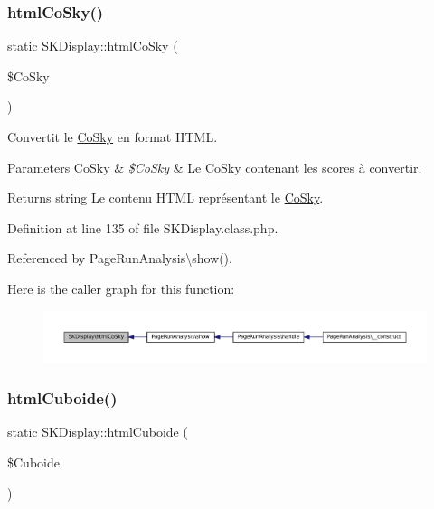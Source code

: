 \subsubsection{\texorpdfstring{html\+Co\+Sky()}{htmlCoSky()}}
{\footnotesize\ttfamily static S\+K\+Display\+::html\+Co\+Sky (\begin{DoxyParamCaption}\item[{}]{\$\+Co\+Sky }\end{DoxyParamCaption})\hspace{0.3cm}{\ttfamily [static]}}

Convertit le \hyperlink{class_co_sky}{Co\+Sky} en format H\+T\+ML.


\begin{DoxyParams}[1]{Parameters}
\hyperlink{class_co_sky}{Co\+Sky} & {\em \$\+Co\+Sky} & Le \hyperlink{class_co_sky}{Co\+Sky} contenant les scores à convertir. \\
\hline
\end{DoxyParams}
\begin{DoxyReturn}{Returns}
string Le contenu H\+T\+ML représentant le \hyperlink{class_co_sky}{Co\+Sky}. 
\end{DoxyReturn}


Definition at line 135 of file S\+K\+Display.\+class.\+php.



Referenced by Page\+Run\+Analysis\textbackslash{}show().

Here is the caller graph for this function\+:\nopagebreak
\begin{figure}[H]
\begin{center}
\leavevmode
\includegraphics[width=350pt]{class_s_k_display_a300475659a3435d38f6dc5c5ee8b5643_icgraph}
\end{center}
\end{figure}
\mbox{\label{class_s_k_display_a9a8e373b3aec7d3cbb8ce82b0a2b8b31}} 
\subsubsection{\texorpdfstring{html\+Cuboide()}{htmlCuboide()}}
{\footnotesize\ttfamily static S\+K\+Display\+::html\+Cuboide (\begin{DoxyParamCaption}\item[{}]{\$\+Cuboide }\end{DoxyParamCaption})\hspace{0.3cm}{\ttfamily [static]}}

